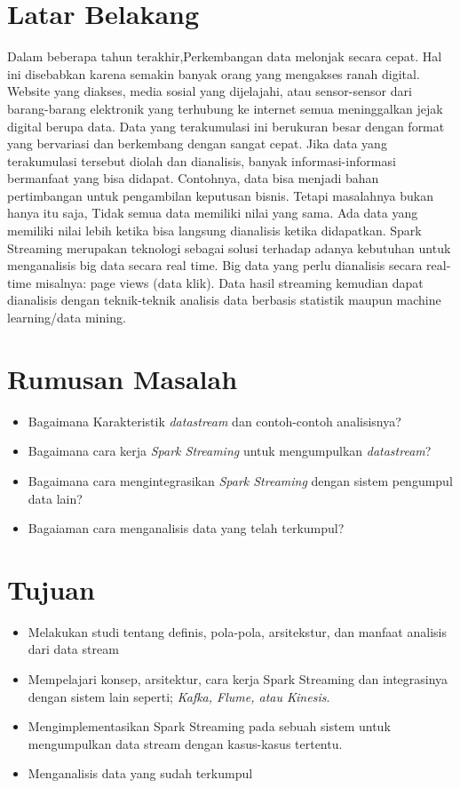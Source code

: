 \documentclass[a4paper,twoside]{article}
\begin{document}
\section{Latar Belakang}
 Dalam beberapa tahun terakhir,Perkembangan data melonjak secara cepat. Hal ini disebabkan karena
semakin banyak orang yang mengakses ranah digital. Website yang diakses, media sosial yang dijelajahi, atau
sensor-sensor dari barang-barang elektronik yang terhubung ke internet semua meninggalkan jejak digital
berupa data. Data yang terakumulasi ini berukuran besar dengan format yang bervariasi dan berkembang
dengan sangat cepat.
Jika data yang terakumulasi tersebut diolah dan dianalisis, banyak informasi-informasi bermanfaat yang bisa
didapat. Contohnya, data bisa menjadi bahan pertimbangan untuk pengambilan keputusan bisnis. Tetapi
masalahnya bukan hanya itu saja, Tidak semua data memiliki nilai yang sama. Ada data yang memiliki
nilai lebih ketika bisa langsung dianalisis ketika didapatkan.
Spark Streaming merupakan teknologi sebagai solusi terhadap adanya kebutuhan untuk menganalisis big data
secara real time. Big data yang perlu dianalisis secara real-time misalnya: page views (data klik). Data hasil
streaming kemudian dapat dianalisis dengan teknik-teknik analisis data berbasis statistik maupun machine
learning/data mining.

\section{Rumusan Masalah}
 \begin{itemize}
 	\item Bagaimana Karakteristik \textit{datastream} dan contoh-contoh analisisnya?
 	\item Bagaimana cara kerja \textit{Spark Streaming} untuk mengumpulkan \textit{datastream}?
 	\item Bagaimana cara mengintegrasikan \textit{Spark Streaming} dengan sistem pengumpul data 		  lain?
 	\item Bagaiaman cara menganalisis data yang telah terkumpul?
 \end{itemize}
 
\section{Tujuan}
\begin{itemize}
	\item Melakukan studi tentang definis, pola-pola, arsitekstur, dan manfaat analisis dari 			  data stream
	\item Mempelajari konsep, arsitektur, cara kerja Spark Streaming dan integrasinya dengan 			  sistem lain seperti; \textit{Kafka, Flume, atau Kinesis}.
	\item Mengimplementasikan Spark Streaming pada sebuah sistem untuk mengumpulkan data stream
		  dengan kasus-kasus tertentu.
	\item Menganalisis data yang sudah terkumpul
	
\end{itemize}
\end{document}
